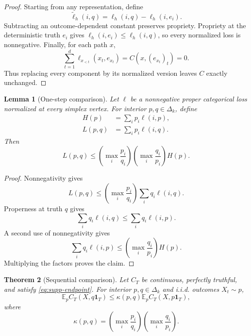 \documentclass[twoside]{article}
\newtheorem{theorem}{Theorem}
\newtheorem{lemma}[theorem]{Lemma}
\newcommand{\E}{\mathbb E}
\newcommand{\1}{\mathbf 1}
\begin{document}
\begin{proof}
Starting from any representation, define
\begin{equation*}
 \widetilde\ell_h(i,q)=\ell_h(i,q)-\ell_h(i,e_i).
\end{equation*}
Subtracting an outcome-dependent constant preserves propriety. Propriety at
the deterministic truth $e_i$ gives
$\ell_h(i,e_i)\leq\ell_h(i,q)$, so every normalized loss is nonnegative.
Finally, for each path $x$,
\begin{equation*}
 \sum_{t=1}^d\ell_{x_{<t}}(x_t,e_{x_t})
 =C(x,(e_{x_t})_t)=0.
\end{equation*}
Thus replacing every component by its normalized version leaves $C$ exactly
unchanged.
\end{proof}

\begin{lemma}[One-step comparison]
\label{lem:supp-one-step}
Let $\ell$ be a nonnegative proper categorical loss normalized at every
simplex vertex. For interior $p,q\in\Delta_k$, define
\begin{align*}
 H(p)&=\sum_i p_i\ell(i,p),\\
 L(p,q)&=\sum_i p_i\ell(i,q).
\end{align*}
Then
\begin{equation}
 L(p,q)\leq
 \left(\max_i\frac{p_i}{q_i}\right)
 \left(\max_i\frac{q_i}{p_i}\right)H(p).
 \label{eq:supp-one-step}
\end{equation}
\end{lemma}

\begin{proof}
Nonnegativity gives
\begin{equation*}
 L(p,q)\leq\left(\max_i\frac{p_i}{q_i}\right)
 \sum_i q_i\ell(i,q).
\end{equation*}
Properness at truth $q$ gives
\begin{equation*}
 \sum_i q_i\ell(i,q)\leq\sum_i q_i\ell(i,p).
\end{equation*}
A second use of nonnegativity gives
\begin{equation*}
 \sum_i q_i\ell(i,p)
 \leq\left(\max_i\frac{q_i}{p_i}\right)H(p).
\end{equation*}
Multiplying the factors proves the claim.
\end{proof}

\begin{theorem}[Sequential comparison]
\label{thm:supp-ratio}
Let $C_T$ be continuous, perfectly truthful, and satisfy
\eqref{eq:supp-endpoint}. For interior $p,q\in\Delta_k$ and i.i.d. outcomes
$X_t\sim p$,
\begin{equation}
 \E_p C_T(X,q\1_T)\leq\kappa(p,q)\E_p C_T(X,p\1_T),
 \label{eq:supp-sequential-ratio}
\end{equation}
where
\begin{equation*}
 \kappa(p,q)=\left(\max_i\frac{p_i}{q_i}\right)
             \left(\max_i\frac{q_i}{p_i}\right).
\end{equation*}
\end{theorem}
\end{document}

